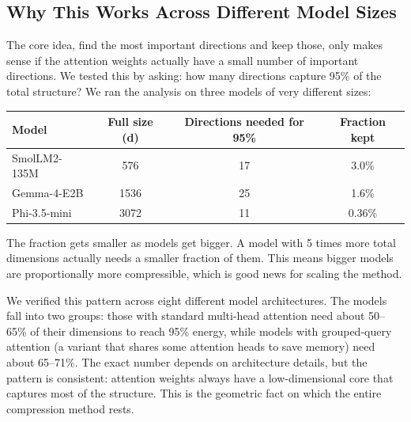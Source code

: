 \documentclass[11pt]{article}
\begin{document}
\subsection{Why This Works Across Different Model Sizes}

The core idea, find the most important directions and keep those, only makes
sense if the attention weights actually have a small number of important
directions. We tested this by asking: how many directions capture 95\% of the
total structure? We ran the analysis on three models of very different sizes:

\begin{center}
\begin{tabular}{lccc}
\toprule
Model & Full size (d) & Directions needed for 95\% & Fraction kept \\
\midrule
SmolLM2-135M   & 576  & 17 & 3.0\% \\
Gemma-4-E2B    & 1536 & 25 & 1.6\% \\
Phi-3.5-mini   & 3072 & 11 & 0.36\% \\
\bottomrule
\end{tabular}
\end{center}

The fraction gets smaller as models get bigger. A model with 5 times
more total dimensions actually needs a smaller fraction of them. This
means bigger models are proportionally more compressible, which is good news
for scaling the method.

We verified this pattern across eight different model architectures. The
models fall into two groups: those with standard multi-head attention need
about 50--65\% of their dimensions to reach 95\% energy, while models with
grouped-query attention (a variant that shares some attention heads to save
memory) need about 65--71\%. The exact number depends on architecture details,
but the pattern is consistent: attention weights always have a low-dimensional
core that captures most of the structure. This is the geometric fact on which
the entire compression method rests.
\end{document}
